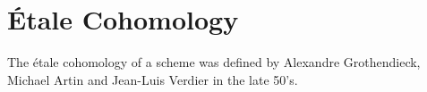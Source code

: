 \section{\'Etale Cohomology}
The \'etale cohomology of a scheme was defined by Alexandre Grothendieck, Michael Artin and Jean-Luis Verdier in the late 50's.
